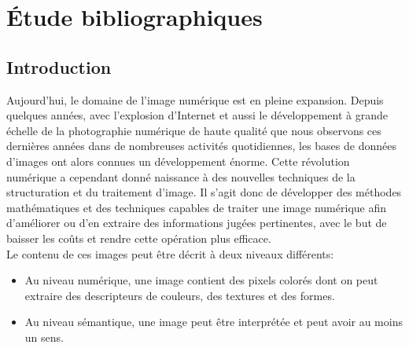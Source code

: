 
\chapter{Étude bibliographiques} %

\label{ChapterX} %


\section{Introduction}
Aujourd’hui, le domaine de l'image numérique est en pleine expansion. Depuis quelques années, avec l'explosion d'Internet et aussi le développement à grande échelle de la photographie numérique de haute qualité que nous observons ces dernières années dans de nombreuses activités quotidiennes, les bases de données d'images ont alors connues un développement énorme. Cette révolution numérique a cependant donné naissance à des nouvelles techniques de la structuration et du traitement d'image. Il s'agit donc de développer des méthodes mathématiques et des techniques capables de traiter une image numérique afin d’améliorer ou d’en extraire des informations jugées pertinentes, avec le but de baisser les coûts et rendre cette opération plus efficace.\\

Le contenu de ces images peut être décrit à deux niveaux différents: 
\begin{itemize}
	\item Au niveau numérique, une image contient des pixels colorés dont on peut extraire des descripteurs de couleurs, des textures et des formes. 
	\item Au niveau sémantique, une image peut être interprétée et peut avoir au moins un sens. 
\end{itemize}

